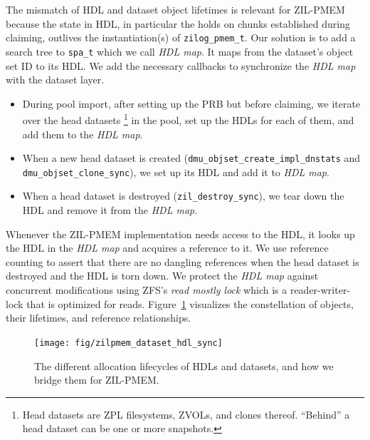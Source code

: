 \documentclass[12pt,a4paper,twoside]{book}
\begin{document}
The mismatch of HDL and dataset object lifetimes is relevant for ZIL-PMEM because the state in HDL, in particular the holds on chunks established during claiming, outlives the instantiation(s) of \lstinline{zilog_pmem_t}.
Our solution is to add a search tree to \lstinline{spa_t} which we call \textit{HDL map}.
It maps from the dataset's object set ID to its HDL.
We add the necessary callbacks to synchronize the \textit{HDL map} with the dataset layer.
\begin{itemize}[noitemsep]
    \item During pool import, after setting up the PRB but before claiming, we iterate over the head datasets%
        \footnote{Head datasets are ZPL filesystems, ZVOLs, and clones thereof. ``Behind'' a head dataset can be one or more snapshots.}
        in the pool, set up the HDLs for each of them, and add them to the \textit{HDL map}.
    \item When a new head dataset is created (\lstinline{dmu_objset_create_impl_dnstats} and \lstinline{dmu_objset_clone_sync}), we set up its HDL and add it to \textit{HDL map}.
    \item When a head dataset is destroyed (\lstinline{zil_destroy_sync}), we tear down the HDL and remove it from the \textit{HDL map}.
\end{itemize}

Whenever the ZIL-PMEM implementation needs access to the HDL, it looks up the HDL in the \textit{HDL map} and acquires a reference to it.
We use reference counting to assert that there are no dangling references when the head dataset is destroyed and the HDL is torn down.
We protect the \textit{HDL map} against concurrent modifications using ZFS's \textit{read mostly lock} which is a reader-writer-lock that is optimized for reads.
Figure~\ref{fig:zilpmem:datasethdlsync} visualizes the constellation of objects, their lifetimes, and reference relationships.

\begin{figure}[H]
    \centering
    \texttt{[image: fig/zilpmem\_dataset\_hdl\_sync]}
    \caption{The different allocation lifecycles of HDLs and datasets, and how we bridge them for ZIL-PMEM.}
    \label{fig:zilpmem:datasethdlsync}
\end{figure}
\end{document}
